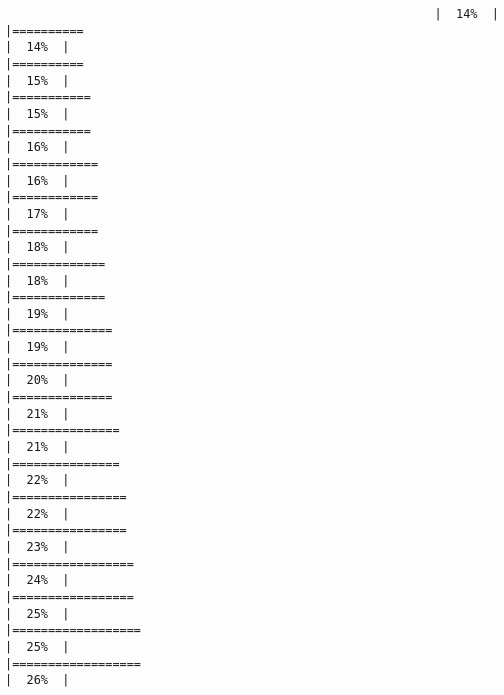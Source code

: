 \documentclass[
]{article}
\begin{document}
\begin{verbatim}
                                                            |  14%  |                                                                              |==========                                                            |  14%  |                                                                              |==========                                                            |  15%  |                                                                              |===========                                                           |  15%  |                                                                              |===========                                                           |  16%  |                                                                              |============                                                          |  16%  |                                                                              |============                                                          |  17%  |                                                                              |============                                                          |  18%  |                                                                              |=============                                                         |  18%  |                                                                              |=============                                                         |  19%  |                                                                              |==============                                                        |  19%  |                                                                              |==============                                                        |  20%  |                                                                              |==============                                                        |  21%  |                                                                              |===============                                                       |  21%  |                                                                              |===============                                                       |  22%  |                                                                              |================                                                      |  22%  |                                                                              |================                                                      |  23%  |                                                                              |=================                                                     |  24%  |                                                                              |=================                                                     |  25%  |                                                                              |==================                                                    |  25%  |                                                                              |==================                                                    |  26%  |                                                                              
\end{verbatim}
\end{document}
